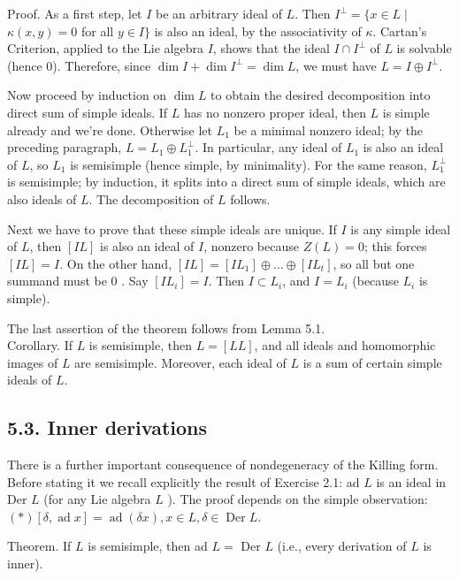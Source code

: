 \documentclass[10pt]{article}
\begin{document}
Proof. As a first step, let $I$ be an arbitrary ideal of $L$. Then $I^{\perp}=\{x \in L \mid$ $\kappa(x, y)=0$ for all $y \in I\}$ is also an ideal, by the associativity of $\kappa$. Cartan's Criterion, applied to the Lie algebra $I$, shows that the ideal $I \cap I^{\perp}$ of $L$ is solvable (hence 0). Therefore, since $\operatorname{dim} I+\operatorname{dim} I^{\perp}=\operatorname{dim} L$, we must have $L=I \oplus I^{\perp}$.

Now proceed by induction on $\operatorname{dim} L$ to obtain the desired decomposition into direct sum of simple ideals. If $L$ has no nonzero proper ideal, then $L$ is simple already and we're done. Otherwise let $L_{1}$ be a minimal nonzero ideal; by the preceding paragraph, $L=L_{1} \oplus L_{1}^{\perp}$. In particular, any ideal of $L_{1}$ is also an ideal of $L$, so $L_{1}$ is semisimple (hence simple, by minimality). For the same reason, $L_{1}^{\perp}$ is semisimple; by induction, it splits into a direct sum of simple ideals, which are also ideals of $L$. The decomposition of $L$ follows.

Next we have to prove that these simple ideals are unique. If $I$ is any simple ideal of $L$, then $[I L]$ is also an ideal of $I$, nonzero because $Z(L)=0$; this forces $[I L]=I$. On the other hand, $[I L]=\left[I L_{1}\right] \oplus \ldots \oplus\left[I L_{t}\right]$, so all but one summand must be 0 . Say $\left[I L_{i}\right]=I$. Then $I \subset L_{i}$, and $I=L_{i}$ (because $L_{i}$ is simple).

The last assertion of the theorem follows from Lemma 5.1.\\
Corollary. If $L$ is semisimple, then $L=[L L]$, and all ideals and homomorphic images of $L$ are semisimple. Moreover, each ideal of $L$ is a sum of certain simple ideals of $L$.

\subsection*{5.3. Inner derivations}
There is a further important consequence of nondegeneracy of the Killing form. Before stating it we recall explicitly the result of Exercise 2.1: ad $L$ is an ideal in Der $L$ (for any Lie algebra $L$ ). The proof depends on the simple observation: $(*)[\delta, \operatorname{ad} x]=\operatorname{ad}(\delta x), x \in L, \delta \in \operatorname{Der} L$.

Theorem. If $L$ is semisimple, then ad $L=$ Der $L$ (i.e., every derivation of $L$ is inner).
\end{document}
